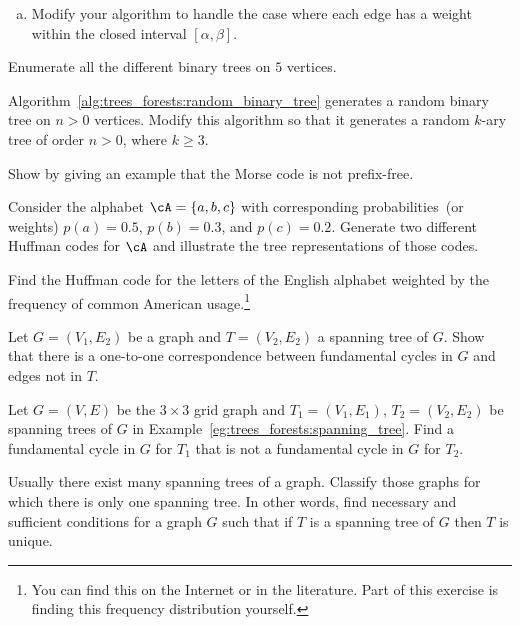 \begin{problem}
\begin{enumerate}[(a)]
  \item Modify your algorithm to handle the case where each edge has a
    weight within the closed interval $[\alpha, \beta]$.
  \end{enumerate}

\item Enumerate all the different binary trees on
  $5$ vertices.

\item Algorithm~\ref{alg:trees_forests:random_binary_tree} generates a
  random binary tree
  on $n > 0$ vertices. Modify this algorithm so that it generates a
  random $k$-ary tree of order $n > 0$, where $k \geq 3$.

\item Show by giving an example that the Morse code
  is not prefix-free.

\item Consider the alphabet $\cA = \{a,b,c\}$ with corresponding
  probabilities~(or weights) $p(a) = 0.5$, $p(b) = 0.3$, and
  $p(c) = 0.2$. Generate two different Huffman
  codes for $\cA$ and illustrate the tree representations of those
  codes.

\item Find the Huffman code for the letters of the
  English alphabet weighted by the frequency
  of common American usage.\footnote{
    You can find this on the Internet or in the literature. Part of
    this exercise is finding this frequency distribution yourself.
  }

\item Let $G = (V_1, E_2)$ be a graph and $T = (V_2, E_2)$ a spanning
  tree of $G$. Show that there is a one-to-one correspondence between
  fundamental cycles in $G$ and edges not in
  $T$.

\item Let $G = (V,E)$ be the $3 \times 3$ grid graph
  and $T_1 = (V_1, E_1)$, $T_2 = (V_2, E_2)$ be spanning trees of $G$
  in Example~\ref{eg:trees_forests:spanning_tree}. Find a fundamental
  cycle in $G$ for $T_1$ that is not a fundamental cycle in $G$ for
  $T_2$.

\item Usually there exist many spanning trees of a graph. Classify
  those graphs for which there is only one spanning tree. In other
  words, find necessary and sufficient conditions for a graph $G$ such
  that if $T$ is a spanning tree of $G$ then $T$ is unique.


\end{problem}
